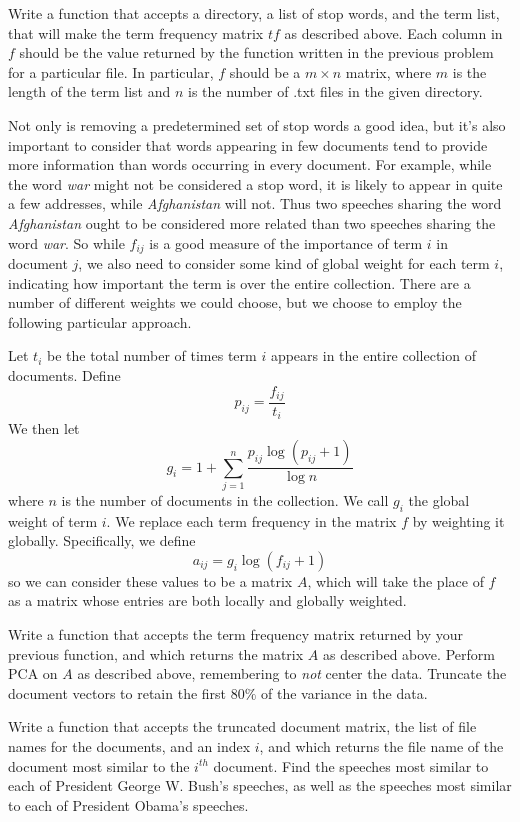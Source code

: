 \begin{problem}
Write a function that accepts a directory, a list of stop words, and the term list,
that will make the term frequency matrix $t\!f$ as described above.
Each column in $f$ should be the value returned by the function written in the
previous problem for a particular file. In particular, $f$ should be a
$m \times n$ matrix, where $m$ is the length of the term list and
$n$ is the number of .txt files in the given directory.
\end{problem}

Not only is removing a predetermined set of stop words a good idea,
but it's also important to consider that words appearing in few documents tend
to provide more information than words occurring in every document.
For example, while the word \emph{war} might not be considered a stop word,
it is likely to appear in quite a few addresses, while \emph{Afghanistan} will not.
Thus two speeches sharing the word \emph{Afghanistan} ought to be considered more
related than two speeches sharing the word \emph{war}.
So while $f_{ij}$ is a good measure of the importance of term $i$ in document $j$,
we also need to consider some kind of global weight for each term $i$,
indicating how important the term is over the entire collection.
There are a number of different weights we could choose, but we choose to employ
the following particular approach.

Let $t_{i}$ be the total number of times term $i$ appears in the entire
collection of documents.
Define
\begin{equation*}
p_{ij} = \frac{f_{ij}}{t_{i}}
\end{equation*}
We then let
\begin{equation*}
g_{i} = 1 + \sum_{j=1}^{n} \frac{p_{ij} \log (p_{ij} + 1)}{\log n}
\end{equation*}
where $n$ is the number of documents in the collection.
We call $g_{i}$ the global weight of term $i$.
We replace each term frequency in the matrix $f$ by weighting it globally.
Specifically, we define
\begin{equation*}
a_{ij} = g_{i} \log (f_{ij} + 1)
\end{equation*}
so we can consider these values to be a matrix $A$, which will take the place of
$f$ as a matrix whose entries are both locally and globally weighted.

\begin{problem}
Write a function that accepts the term frequency matrix returned by your previous
function, and which returns the matrix $A$ as described above.
Perform PCA on $A$ as described above, remembering to \emph{not} center the data.
Truncate the document vectors to retain the first $80\%$ of the variance in the data.
\end{problem}

\begin{problem}
Write a function that accepts the truncated document matrix, the list of file names
for the documents, and an index $i$, and which returns the file name of the document
most similar to the $i^{th}$ document. Find the speeches most similar to each of
President George W. Bush's speeches, as well as the speeches most similar to
each of President Obama's speeches.
\end{problem}
